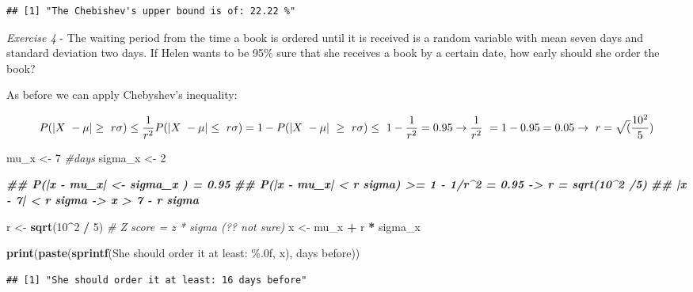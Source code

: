 \documentclass[
]{article}
\newenvironment{Shaded}{\begin{snugshade}}{\end{snugshade}}
\newcommand{\CommentTok}[1]{\textcolor[rgb]{0.56,0.35,0.01}{\textit{#1}}}
\newcommand{\DecValTok}[1]{\textcolor[rgb]{0.00,0.00,0.81}{#1}}
\newcommand{\DocumentationTok}[1]{\textcolor[rgb]{0.56,0.35,0.01}{\textbf{\textit{#1}}}}
\newcommand{\FunctionTok}[1]{\textcolor[rgb]{0.13,0.29,0.53}{\textbf{#1}}}
\newcommand{\NormalTok}[1]{#1}
\newcommand{\OtherTok}[1]{\textcolor[rgb]{0.56,0.35,0.01}{#1}}
\newcommand{\SpecialCharTok}[1]{\textcolor[rgb]{0.81,0.36,0.00}{\textbf{#1}}}
\newcommand{\StringTok}[1]{\textcolor[rgb]{0.31,0.60,0.02}{#1}}
\begin{document}
\begin{verbatim}
## [1] "The Chebishev's upper bound is of: 22.22 %"
\end{verbatim}

\emph{Exercise 4} - The waiting period from the time a book is ordered
until it is received is a random variable with mean seven days and
standard deviation two days. If Helen wants to be 95\% sure that she
receives a book by a certain date, how early should she order the book?

As before we can apply Chebyshev's inequality:

\[
P(|X \ - \mu| \ge \ r\sigma) \le \frac{1}{r^2} \  \\ 
P(|X \ - \mu| \le \ r \sigma) = 1 - P(|X \ - \mu| \ \ge \ r\sigma) \le  \ 1 - \frac{1}{r^2} = 0.95 \\    
\rightarrow \frac{1}{r^2} \ = 1 - 0.95 = 0.05 \rightarrow \ r = \sqrt(\frac{10^2}{5}) 
\]

\begin{Shaded}
\begin{Highlighting}[]
\NormalTok{mu\_x }\OtherTok{\textless{}{-}} \DecValTok{7} \CommentTok{\#days }
\NormalTok{sigma\_x }\OtherTok{\textless{}{-}} \DecValTok{2} 

\DocumentationTok{\#\# P(|x {-} mu\_x| \textless{}{-} sigma\_x ) = 0.95}
\DocumentationTok{\#\# P(|x {-} mu\_x| \textless{} r sigma) \textgreater{}= 1 {-} 1/r\^{}2 = 0.95 {-}\textgreater{} r = sqrt(10\^{}2 /5)}
\DocumentationTok{\#\# |x {-} 7| \textless{} r sigma {-}\textgreater{} x \textgreater{} 7 {-} r sigma}

\NormalTok{r }\OtherTok{\textless{}{-}} \FunctionTok{sqrt}\NormalTok{(}\DecValTok{10}\SpecialCharTok{\^{}}\DecValTok{2} \SpecialCharTok{/} \DecValTok{5}\NormalTok{) }\CommentTok{\# Z score = z * sigma (?? not sure)}
\NormalTok{x }\OtherTok{\textless{}{-}}\NormalTok{ mu\_x }\SpecialCharTok{+}\NormalTok{ r }\SpecialCharTok{*}\NormalTok{ sigma\_x}

\FunctionTok{print}\NormalTok{(}\FunctionTok{paste}\NormalTok{(}\FunctionTok{sprintf}\NormalTok{(}\StringTok{\textquotesingle{}She should order it at least: \%.0f\textquotesingle{}}\NormalTok{, x), }\StringTok{\textquotesingle{}days before\textquotesingle{}}\NormalTok{))}
\end{Highlighting}
\end{Shaded}

\begin{verbatim}
## [1] "She should order it at least: 16 days before"
\end{verbatim}
\end{document}
